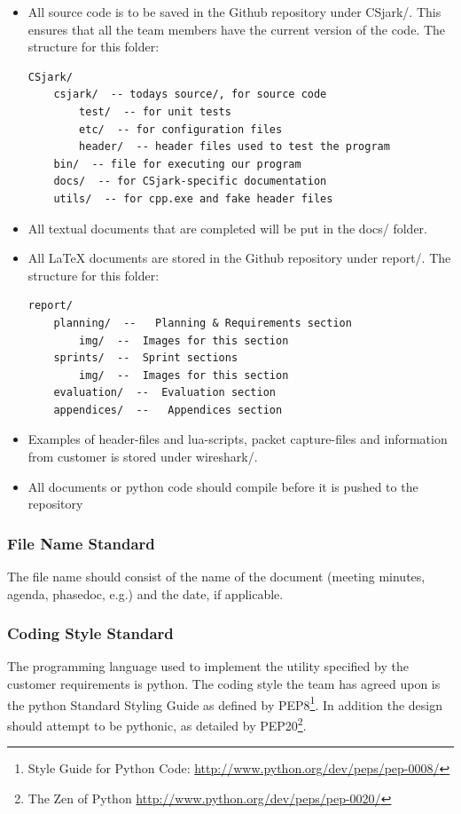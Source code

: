 \begin{itemize}
	\item All source code is to be saved in the Github \gls{repository} under
		CSjark/. This ensures that all the team members have the current
		version of the code. The structure for this folder:
		\begin{verbatim}
CSjark/
    csjark/  -- todays source/, for source code
        test/  -- for unit tests
        etc/  -- for configuration files
        header/  -- header files used to test the program
    bin/  -- file for executing our program
    docs/  -- for CSjark-specific documentation
    utils/  -- for cpp.exe and fake header files
		\end{verbatim}
	\item All textual documents that are completed will be put in the
		docs/ folder.
	\item All LaTeX documents are stored in the Github \gls{repository}
		under report/. The structure for this folder:
		\begin{verbatim}
report/
    planning/  --   Planning & Requirements section
        img/  --  Images for this section
    sprints/  --  Sprint sections
        img/  --  Images for this section
    evaluation/  --  Evaluation section
    appendices/  --   Appendices section
		\end{verbatim}
	\item Examples of \gls{header}-files and \Gls{lua}-\glspl{script}, \gls{packet} capture-files and information from customer is stored under \Gls{wireshark}/.
	\item All documents or python code should compile before it is pushed to the repository
\end{itemize}

\subsubsection{File Name Standard}
The file name should consist of the name of the document (meeting minutes,
agenda, phasedoc, e.g.) and the date, if applicable.

\subsubsection{Coding Style Standard}
The programming language used to implement the utility specified by the
customer requirements is \Gls{python}. The coding style the team has agreed upon is
the \Gls{python} Standard Styling Guide as defined by
PEP8\footnote{Style Guide for Python Code: \url{http://www.python.org/dev/peps/pep-0008/}}.
In addition the design should attempt to be pythonic, as detailed by
PEP20\footnote{The Zen of Python \url{http://www.python.org/dev/peps/pep-0020/}}.

